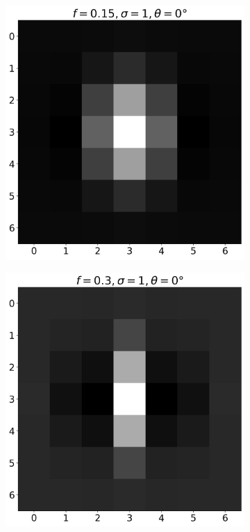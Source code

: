 \documentclass[12pt,a4paper, english]{article}
\begin{document}
    \begin{figure}[!htbp]
      \centering
      \begin{subfigure}[b]{0.3\textwidth}
        \includegraphics[width=\textwidth]{img/K0.png}
      \end{subfigure}
      \begin{subfigure}[b]{0.3\textwidth}
        \includegraphics[width=\textwidth]{img/K1.png}

\end{subfigure}
\end{figure}
\end{document}
